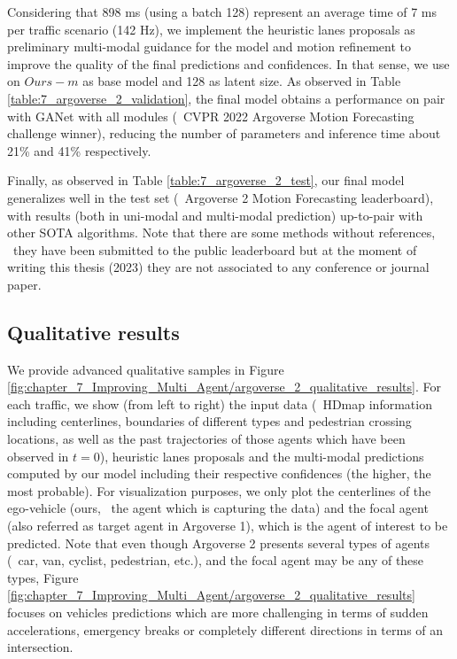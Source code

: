 Considering that 898 ms (using a batch 128) represent an average time of 7 ms per traffic scenario (142 Hz), we implement the heuristic lanes proposals as preliminary multi-modal guidance for the model and motion refinement to improve the quality of the final predictions and confidences. In that sense, we use on $Ours-m$ as base model and 128 as latent size. As observed in Table \ref{table:7_argoverse_2_validation}, the final model obtains a performance on pair with GANet \cite{wang2022ganet} with all modules (\ie \ CVPR 2022 Argoverse Motion Forecasting challenge winner), reducing the number of parameters and inference time about 21\% and 41\% respectively. 

Finally, as observed in Table \ref{table:7_argoverse_2_test}, our final model generalizes well in the test set (\ie \ Argoverse 2 Motion Forecasting leaderboard), with results (both in uni-modal and multi-modal prediction) up-to-pair with other \ac{SOTA} algorithms. Note that there are some methods without references, \ie \ they have been submitted to the public leaderboard but at the moment of writing this thesis (2023) they are not associated to any conference or journal paper.

\subsection{Qualitative results}
\label{subsec:7_efficient_baselines_qualitative_results}

We provide advanced qualitative samples in Figure \ref{fig:chapter_7_Improving_Multi_Agent/argoverse_2_qualitative_results}. For each traffic, we show (from left to right) the input data (\ie \ \ac{HDmap} information including centerlines, boundaries of different types and pedestrian crossing locations, as well as the past trajectories of those agents which have been observed in $t=0$), heuristic lanes proposals and the multi-modal predictions computed by our model including their respective confidences (the higher, the most probable). For visualization purposes, we only plot the centerlines of the ego-vehicle (ours, \ie \ the agent which is capturing the data) and the focal agent (also referred as target agent in Argoverse 1), which is the agent of interest to be predicted. Note that even though Argoverse 2 presents several types of agents (\eg \ car, van, cyclist, pedestrian, etc.), and the focal agent may be any of these types, Figure \ref{fig:chapter_7_Improving_Multi_Agent/argoverse_2_qualitative_results} focuses on vehicles predictions which are more challenging in terms of sudden accelerations, emergency breaks or completely different directions in terms of an intersection.

